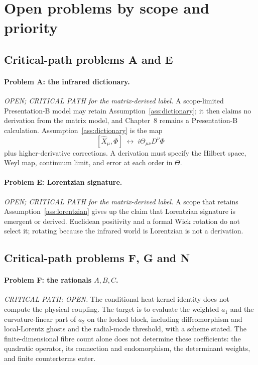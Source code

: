\section{Open problems by scope and priority}
\label{sec:ch17-coeff}

\subsection{Critical-path problems A and E}

\paragraph{Problem A: the infrared dictionary.}
\emph{OPEN; CRITICAL PATH for the matrix-derived label.} A
scope-limited Presentation-B model may retain
Assumption~\ref{ass:dictionary}; it then claims no derivation from
the matrix model, and Chapter~8 remains a Presentation-B
calculation.
Assumption~\ref{ass:dictionary} is the map
\begin{equation}
  \label{eq:dict-again}
  [\hat X_\mu,\Phi]
  \;\longleftrightarrow\;
  i\Theta_{\mu\nu}D^\nu\Phi
\end{equation}
plus higher-derivative corrections. A derivation must specify the
Hilbert space, Weyl map, continuum limit, and error at each order in
\(\Theta\).

\paragraph{Problem E: Lorentzian signature.}
\emph{OPEN; CRITICAL PATH for the matrix-derived label.} A scope
that retains Assumption~\ref{ass:lorentzian} gives up the claim that
Lorentzian signature is emergent or derived. Euclidean positivity
and a formal Wick rotation do not select it; rotating because the
infrared world is Lorentzian is not a derivation.

\subsection{Critical-path problems F, G and N}

\paragraph{Problem F: the rationals \(A,B,C\).}
\emph{CRITICAL PATH; OPEN.} The conditional heat-kernel identity
does not compute the physical coupling.
The target is to evaluate the weighted \(a_1\) and the
curvature-linear part of \(a_2\) on the locked block, including
diffeomorphism and local-Lorentz ghosts and the radial-mode
threshold, with a scheme stated. The finite-dimensional fibre count
alone does not determine these coefficients: the quadratic operator,
its connection and endomorphism, the determinant weights, and finite
counterterms enter.

